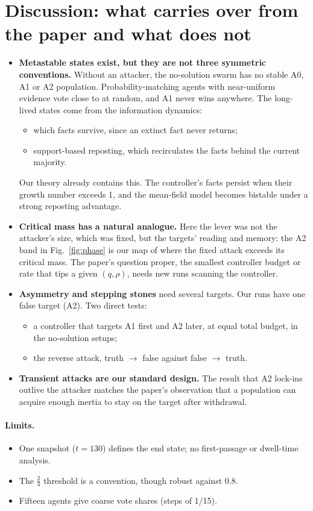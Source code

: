 \documentclass[10pt,a4paper]{article}
\begin{document}
\section{Discussion: what carries over from the paper and what does not}
\begin{itemize}
\item \textbf{Metastable states exist, but they are not three symmetric conventions.} Without an attacker, the
  no-solution swarm has no stable A0, A1 or A2 population. Probability-matching agents with near-uniform evidence
  vote close to at random, and A1 never wins anywhere. The long-lived states come from the information dynamics:
  \begin{itemize}
  \item which facts survive, since an extinct fact never returns;
  \item support-based reposting, which recirculates the facts behind the current majority.
  \end{itemize}
  Our theory already contains this. The controller's facts persist when their growth number exceeds 1, and the
  mean-field model becomes bistable under a strong reposting advantage.
\item \textbf{Critical mass has a natural analogue.} Here the lever was not the attacker's size, which was fixed, but
  the targets' reading and memory: the A2 band in Fig.~\ref{fig:phase} is our map of where the fixed attack exceeds
  its critical mass. The paper's question proper, the smallest controller budget or rate that tips a given
  $(q,\rho)$, needs new runs scanning the controller.
\item \textbf{Asymmetry and stepping stones} need several targets. Our runs have one false target (A2). Two direct
  tests:
  \begin{itemize}
  \item a controller that targets A1 first and A2 later, at equal total budget, in the no-solution setups;
  \item the reverse attack, truth $\to$ false against false $\to$ truth.
  \end{itemize}
\item \textbf{Transient attacks are our standard design.} The result that A2 lock-ins outlive the attacker matches the
  paper's observation that a population can acquire enough inertia to stay on the target after withdrawal.
\end{itemize}

\paragraph{Limits.}
\begin{itemize}
\item One snapshot ($t=130$) defines the end state; no first-passage or dwell-time analysis.
\item The $\tfrac23$ threshold is a convention, though robust against 0.8.
\item Fifteen agents give coarse vote shares (steps of 1/15).
\end{itemize}
\end{document}
